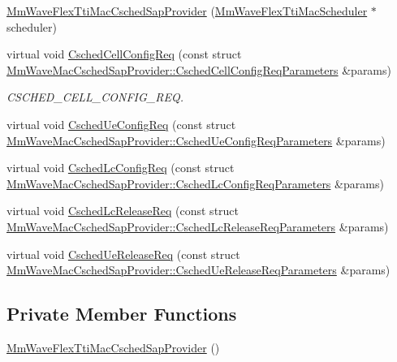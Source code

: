 \begin{DoxyCompactItemize}
\item 
\hyperlink{classns3_1_1MmWaveFlexTtiMacCschedSapProvider_a68afb969f6c41b3d9ad93dc897f96359}{Mm\+Wave\+Flex\+Tti\+Mac\+Csched\+Sap\+Provider} (\hyperlink{classns3_1_1MmWaveFlexTtiMacScheduler}{Mm\+Wave\+Flex\+Tti\+Mac\+Scheduler} $\ast$scheduler)
\item 
virtual void \hyperlink{classns3_1_1MmWaveFlexTtiMacCschedSapProvider_ab9f93f39e252631fabd114bf1a2b0f87}{Csched\+Cell\+Config\+Req} (const struct \hyperlink{structns3_1_1MmWaveMacCschedSapProvider_1_1CschedCellConfigReqParameters}{Mm\+Wave\+Mac\+Csched\+Sap\+Provider\+::\+Csched\+Cell\+Config\+Req\+Parameters} \&params)
\begin{DoxyCompactList}\small\item\em C\+S\+C\+H\+E\+D\+\_\+\+C\+E\+L\+L\+\_\+\+C\+O\+N\+F\+I\+G\+\_\+\+R\+EQ. \end{DoxyCompactList}\item 
virtual void \hyperlink{classns3_1_1MmWaveFlexTtiMacCschedSapProvider_a7d5a808aedbc3209642c94a567cd6a0d}{Csched\+Ue\+Config\+Req} (const struct \hyperlink{structns3_1_1MmWaveMacCschedSapProvider_1_1CschedUeConfigReqParameters}{Mm\+Wave\+Mac\+Csched\+Sap\+Provider\+::\+Csched\+Ue\+Config\+Req\+Parameters} \&params)
\item 
virtual void \hyperlink{classns3_1_1MmWaveFlexTtiMacCschedSapProvider_afa293eaab4a6294db0215bb7f3cf61f9}{Csched\+Lc\+Config\+Req} (const struct \hyperlink{structns3_1_1MmWaveMacCschedSapProvider_1_1CschedLcConfigReqParameters}{Mm\+Wave\+Mac\+Csched\+Sap\+Provider\+::\+Csched\+Lc\+Config\+Req\+Parameters} \&params)
\item 
virtual void \hyperlink{classns3_1_1MmWaveFlexTtiMacCschedSapProvider_a2ebf5d1c8b53601676eb3bcd45dff41d}{Csched\+Lc\+Release\+Req} (const struct \hyperlink{structns3_1_1MmWaveMacCschedSapProvider_1_1CschedLcReleaseReqParameters}{Mm\+Wave\+Mac\+Csched\+Sap\+Provider\+::\+Csched\+Lc\+Release\+Req\+Parameters} \&params)
\item 
virtual void \hyperlink{classns3_1_1MmWaveFlexTtiMacCschedSapProvider_afc91284addc8ba819127af0b2f61101c}{Csched\+Ue\+Release\+Req} (const struct \hyperlink{structns3_1_1MmWaveMacCschedSapProvider_1_1CschedUeReleaseReqParameters}{Mm\+Wave\+Mac\+Csched\+Sap\+Provider\+::\+Csched\+Ue\+Release\+Req\+Parameters} \&params)
\end{DoxyCompactItemize}
\subsection*{Private Member Functions}
\begin{DoxyCompactItemize}
\item 
\hyperlink{classns3_1_1MmWaveFlexTtiMacCschedSapProvider_a09d94b335627a71ce4c5805b9571ea98}{Mm\+Wave\+Flex\+Tti\+Mac\+Csched\+Sap\+Provider} ()
\end{DoxyCompactItemize}
